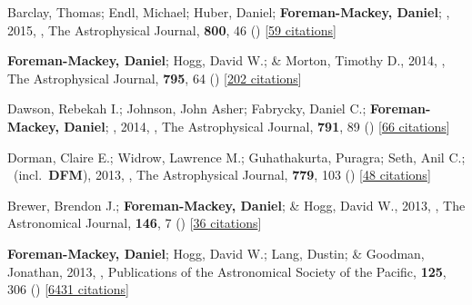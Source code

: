 \item[{\color{numcolor}\scriptsize7}] Barclay, Thomas; Endl, Michael; Huber, Daniel; \textbf{Foreman-Mackey, Daniel}; \etal, 2015, , The Astrophysical Journal, \textbf{800}, 46 () [\href{https://ui.adsabs.harvard.edu/abs/2015ApJ...800...46B}{59 citations}]

\item[{\color{numcolor}\scriptsize6}] \textbf{Foreman-Mackey, Daniel}; Hogg, David W.; \& Morton, Timothy D., 2014, , The Astrophysical Journal, \textbf{795}, 64 () [\href{https://ui.adsabs.harvard.edu/abs/2014ApJ...795...64F}{202 citations}]

\item[{\color{numcolor}\scriptsize5}] Dawson, Rebekah I.; Johnson, John Asher; Fabrycky, Daniel C.; \textbf{Foreman-Mackey, Daniel}; \etal, 2014, , The Astrophysical Journal, \textbf{791}, 89 () [\href{https://ui.adsabs.harvard.edu/abs/2014ApJ...791...89D}{66 citations}]

\item[{\color{numcolor}\scriptsize4}] Dorman, Claire E.; Widrow, Lawrence M.; Guhathakurta, Puragra; Seth, Anil C.; \etal\ (incl.\ \textbf{DFM}), 2013, , The Astrophysical Journal, \textbf{779}, 103 () [\href{https://ui.adsabs.harvard.edu/abs/2013ApJ...779..103D}{48 citations}]

\item[{\color{numcolor}\scriptsize3}] Brewer, Brendon J.; \textbf{Foreman-Mackey, Daniel}; \& Hogg, David W., 2013, , The Astronomical Journal, \textbf{146}, 7 () [\href{https://ui.adsabs.harvard.edu/abs/2013AJ....146....7B}{36 citations}]

\item[{\color{numcolor}\scriptsize2}] \textbf{Foreman-Mackey, Daniel}; Hogg, David W.; Lang, Dustin; \& Goodman, Jonathan, 2013, , Publications of the Astronomical Society of the Pacific, \textbf{125}, 306 () [\href{https://ui.adsabs.harvard.edu/abs/2013PASP..125..306F}{6431 citations}]

